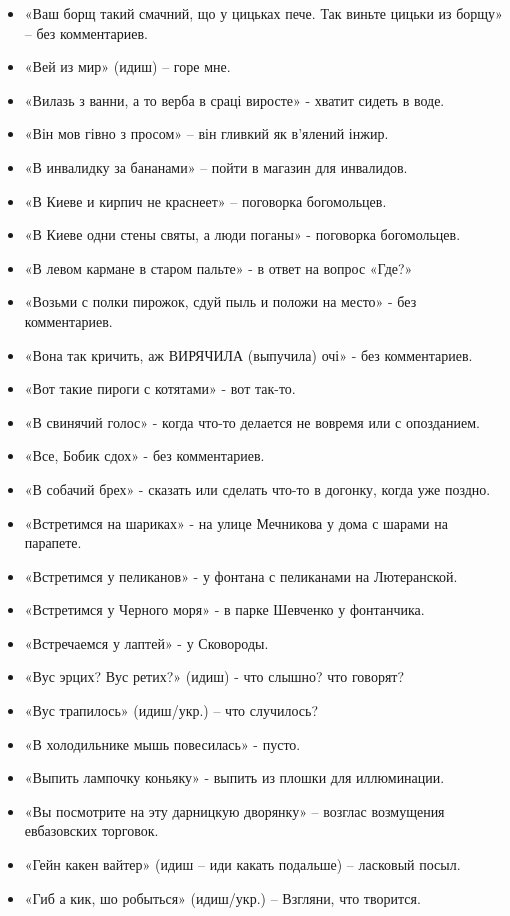 \begin{itemize}
\item  «Ваш борщ такий смачний, що у цицьках пече. Так виньте цицьки из борщу» – без комментариев.
\item  «Вей из мир» (идиш) – горе мне.
\item  «Вилазь з ванни, а то верба в сраці виросте» - хватит сидеть в воде.
\item  «Він мов гівно з просом» – він гливкий як в’ялений інжир. 
\item  «В инвалидку за бананами» – пойти в магазин для инвалидов.
\item  «В Киеве и кирпич не краснеет» – поговорка богомольцев. 
\item  «В Киеве одни стены святы, а люди поганы» - поговорка богомольцев.
\item  «В левом кармане в старом пальте» - в ответ на вопрос «Где?»
\item  «Возьми с полки пирожок, сдуй пыль и положи на место» - без комментариев.
\item  «Вона так кричить, аж ВИРЯЧИЛА (выпучила) очі» - без комментариев.
\item  «Вот такие пироги с котятами» - вот так-то.
\item  «В свинячий голос» - когда что-то делается не вовремя или с опозданием.
\item  «Все, Бобик сдох» - без комментариев.
\item  «В собачий брех» - сказать или сделать что-то в догонку, когда уже поздно.
\item  «Встретимся на шариках» - на улице Мечникова у дома с шарами на парапете. 
\item  «Встретимся у пеликанов» - у фонтана с пеликанами  на Лютеранской.
\item  «Встретимся у Черного моря» - в парке Шевченко у фонтанчика.
\item  «Встречаемся у лаптей» - у Сковороды.
\item  «Вус эрцих? Вус ретих?» (идиш) - что слышно? что говорят?
\item  «Вус трапилось» (идиш/укр.) – что случилось?
\item  «В холодильнике мышь повесилась» - пусто.
\item  «Выпить лампочку коньяку» - выпить из плошки для иллюминации.
\item  «Вы посмотрите на эту дарницкую дворянку» – возглас возмущения евбазовских торговок.
\item  «Гейн какен вайтер» (идиш – иди какать подальше) – ласковый посыл.
\item  «Гиб а кик, шо робыться» (идиш/укр.) – Взгляни, что творится.

\end{itemize}
